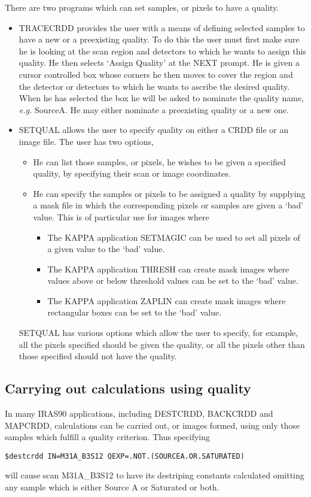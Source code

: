 There are two programs which can set samples, or pixels to have a quality.
\begin{itemize}
\item TRACECRDD provides the user with a means of defining selected samples to
have a new or a preexisting quality. To do this the user must first make sure he
is looking at the scan region and detectors to which he wants to assign this
quality. He then selects `Assign Quality' at the NEXT prompt. He is given a 
cursor controlled box whose corners he then moves to cover the region and the
detector or detectors to which he wants to ascribe the desired quality. When he 
has selected the box he will be asked to nominate the quality name, {\em e.g.}
 SourceA.
He may either nominate a preexisting quality or a new one. 
\item SETQUAL allows the user to specify quality on either a CRDD file or an
image file. The user has two options, 
\begin{itemize}
\item He can list those samples, or pixels, he wishes to be given a specified 
quality, by specifying their scan or image coordinates.
\item He can specify the samples or pixels to be assigned a quality by 
supplying a mask file in which the corresponding pixels or samples are given a
`bad' value. This is of particular use for images where 
\begin{itemize}
\item The KAPPA application SETMAGIC can be used to set all pixels of a given 
value to the `bad' value.
\item The KAPPA application THRESH can create mask images where values above or
below threshold values can be set to the `bad' value.
\item The KAPPA application ZAPLIN can create mask images where rectangular 
boxes can be set to the `bad' value.
\end{itemize}
\end{itemize}
SETQUAL has various options which allow the user to specify, for example, all 
the pixels specified should be given the quality, or all the pixels other than
those specified should not have the quality.
\end{itemize}
\subsection{Carrying out calculations using quality }
In many IRAS90 applications, including DESTCRDD, BACKCRDD and MAPCRDD, 
calculations can be carried out, or images formed, using only those samples
which fulfill a quality criterion. Thus specifying 
\begin{small}
\begin{verbatim}
$destcrdd IN=M31A_B3S12 QEXP=.NOT.(SOURCEA.OR.SATURATED)
\end{verbatim}
\end{small}
will cause scan M31A\_B3S12 to have its destriping constants calculated omitting
any sample which is either Source A or Saturated or both.

